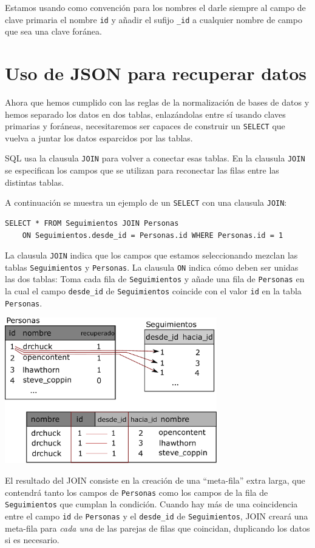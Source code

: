 Estamos usando como
convención para los nombres el darle siempre al campo de clave primaria el nombre
{\tt id} y añadir el sufijo \verb"_id" a cualquier nombre de campo
que sea una clave foránea.

\section{Uso de JSON para recuperar datos}

Ahora que hemos cumplido con las reglas de la normalización de bases de datos
y hemos separado los datos en dos tablas, enlazándolas entre sí usando
claves primarias y foráneas, necesitaremos ser capaces de construir un
{\tt SELECT} que vuelva a juntar los datos esparcidos por las tablas.

SQL usa la clausula {\tt JOIN} para volver a conectar esas tablas.
En la clausula {\tt JOIN} se especifican los campos que se utilizan
para reconectar las filas entre las distintas tablas.

A continuación se muestra un ejemplo de un {\tt SELECT} con una
clausula {\tt JOIN}:

\beforeverb
\begin{verbatim}
SELECT * FROM Seguimientos JOIN Personas 
    ON Seguimientos.desde_id = Personas.id WHERE Personas.id = 1
\end{verbatim}
\afterverb
%
La clausula {\tt JOIN} indica que los campos que estamos seleccionando
mezclan las tablas {\tt Seguimientos} y {\tt Personas}. La clausula
{\tt ON} indica cómo deben ser unidas las dos tablas: Toma cada fila
de {\tt Seguimientos} y añade una fila de {\tt Personas} en la cual el
campo \verb"desde_id" de {\tt Seguimientos} coincide con el valor {\tt id}
en la tabla {\tt Personas}.

\beforefig
\centerline{\includegraphics[height=2.50in]{figs2/join.eps}}
\afterfig

El resultado del JOIN consiste en la creación de una ``meta-fila'' extra larga, que contendrá
tanto los campos de {\tt Personas} como los campos de la fila de {\tt Seguimientos} que cumplan la
condición.
Cuando hay más de una coincidencia entre el campo {\tt id} de {\tt Personas}
y el \verb"desde_id" de {\tt Seguimientos}, JOIN creará una meta-fila
para \emph{cada una} de las parejas de filas que coincidan, duplicando los datos si es necesario.

